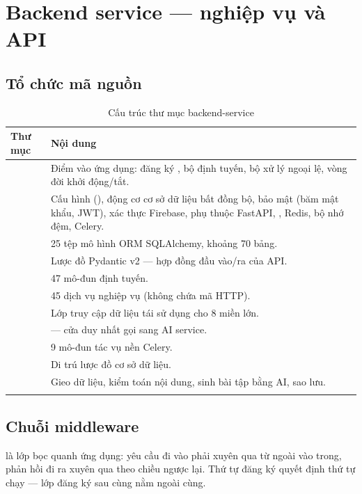 \chapter{Backend service — nghiệp vụ và API}

\section{Tổ chức mã nguồn}

\begin{longtable}{L{4.0cm} L{9.6cm}}
\toprule
\textbf{Thư mục} & \textbf{Nội dung}\\
\midrule
\endhead
{} & Điểm vào ứng dụng: đăng ký , bộ định tuyến, bộ xử lý ngoại lệ, vòng đời khởi động/tắt.\\
 & Cấu hình (), động cơ cơ sở dữ liệu bất đồng bộ, bảo mật (băm mật khẩu, JWT), xác thực Firebase, phụ thuộc FastAPI, , Redis, bộ nhớ đệm, Celery.\\
 & 25 tệp mô hình ORM SQLAlchemy, khoảng 70 bảng.\\
 & Lược đồ Pydantic v2 — hợp đồng đầu vào/ra của API.\\
 & 47 mô-đun định tuyến.\\
 & 45 dịch vụ nghiệp vụ (không chứa mã HTTP).\\
 & Lớp truy cập dữ liệu tái sử dụng cho 8 miền lớn.\\
 &  — cửa duy nhất gọi sang AI service.\\
 & 9 mô-đun tác vụ nền Celery.\\
 & Di trú lược đồ cơ sở dữ liệu.\\
 & Gieo dữ liệu, kiểm toán nội dung, sinh bài tập bằng AI, sao lưu.\\
\bottomrule
\caption{Cấu trúc thư mục backend-service}
\end{longtable}

\section{Chuỗi middleware}

 là lớp bọc quanh ứng dụng: yêu cầu đi vào phải xuyên qua từ ngoài vào
trong, phản hồi đi ra xuyên qua theo chiều ngược lại. Thứ tự đăng ký quyết định thứ tự
chạy — lớp đăng ký sau cùng nằm ngoài cùng.

